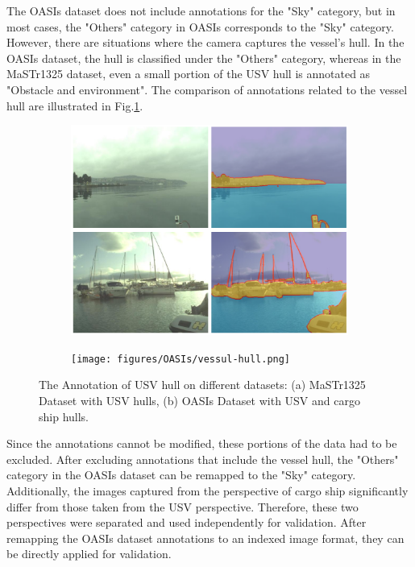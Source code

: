 The OASIs dataset does not include annotations for the "Sky" category, but in most cases, the "Others" category in 
OASIs corresponds to the "Sky" category. However, there are situations where the camera captures the vessel's hull. 
In the OASIs dataset, the hull is classified under the "Others" category, whereas in the MaSTr1325 dataset, even 
a small portion of the USV hull is annotated as "Obstacle and environment". The comparison of annotations related to 
the vessel hull are illustrated in Fig.\ref{fig:vesselhull}. 
\begin{figure}[ht]
    \centering
    \begin{subfigure}[b]{0.45\textwidth}
        \centering
        \includegraphics[width=\textwidth]{figures/MaSTr1325/vessul-hull.png}
        \caption{}
    \end{subfigure}
    \centering
    \begin{subfigure}[b]{0.45\textwidth}
        \centering
        \texttt{[image: figures/OASIs/vessul-hull.png]}
        \caption{}
    \end{subfigure}
    \caption{The Annotation of USV hull on different datasets: (a) MaSTr1325 Dataset with USV hulls, 
    (b) OASIs Dataset with USV and cargo ship hulls.}
    \label{fig:vesselhull}
\end{figure}

Since the annotations cannot be modified, these portions of the data had to be excluded. After excluding 
annotations that include the vessel hull, the "Others" category in the OASIs dataset can be remapped to the "Sky" 
category. Additionally, the images captured from the perspective of cargo ship significantly differ from those taken 
from the USV perspective. Therefore, these two perspectives were separated and used independently for validation. 
After remapping the OASIs dataset annotations to an indexed image format, they can be directly applied for validation.

